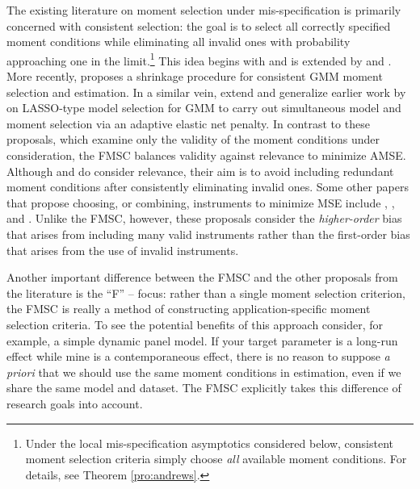 The existing literature on moment selection under mis-specification is primarily concerned with consistent selection: the goal is to select all correctly specified moment conditions while eliminating all invalid ones with probability approaching one in the limit.\footnote{Under the local mis-specification asymptotics considered below, consistent moment selection criteria simply choose \emph{all} available moment conditions. For details, see Theorem \ref{pro:andrews}.}
This idea begins with \cite{Andrews1999} and is extended by  \cite{AndrewsLu} and \cite{HongPrestonShum}.
More recently, \cite{Liao} proposes a shrinkage procedure for consistent GMM moment selection and estimation. 
In a similar vein, \cite{CanerHanLee} extend and generalize earlier work by \cite{Caner2009} on LASSO-type model selection for GMM to carry out simultaneous model and moment selection via an adaptive elastic net penalty. 
In contrast to these proposals, which examine only the validity of the moment conditions under consideration, the FMSC balances validity against relevance to minimize AMSE.
Although \cite{HallPeixe2003} and \cite{ChengLiao} do consider relevance, their aim is to avoid including redundant moment conditions after consistently eliminating invalid ones.
Some other papers that propose choosing, or combining, instruments to minimize MSE include \cite{DonaldNewey2001}, \cite{DonaldImbensNewey2009}, and \cite{KuersteinerOkui2010}.
Unlike the FMSC, however, these proposals consider the \emph{higher-order} bias that arises from including many valid instruments rather than the first-order bias that arises from the use of invalid instruments.

Another important difference between the FMSC and the other proposals from the literature is the ``F'' -- focus: rather than a single moment selection criterion, the FMSC is really a method of constructing application-specific moment selection criteria.
To see the potential benefits of this approach consider, for example, a simple dynamic panel model.
If your target parameter is a long-run effect while mine is a contemporaneous effect, there is no reason to suppose \emph{a priori} that we should use the same moment conditions in estimation, even if we share the same model and dataset.
The FMSC explicitly takes this difference of research goals into account.

